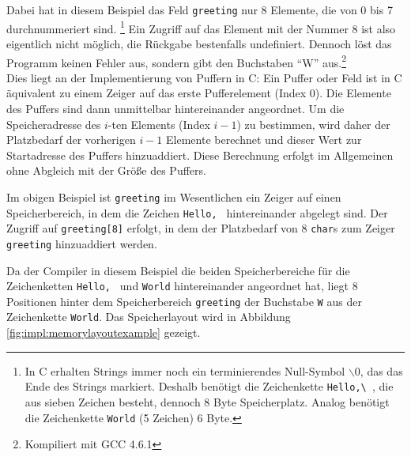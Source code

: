 Dabei hat in diesem Beispiel das Feld \lstinline+greeting+ nur 8 Elemente, die von 0 bis 7 durchnummeriert sind.%
\footnote{In C erhalten Strings immer noch ein terminierendes
  Null-Symbol $\backslash$0, das das Ende des Strings markiert. Deshalb
  benötigt die Zeichenkette \lstinline[showspaces=true]+Hello,\ +, die
  aus sieben Zeichen besteht, dennoch 8 Byte Speicherplatz. Analog
  benötigt die Zeichenkette \lstinline+World+ (5 Zeichen) 6 Byte.}  
Ein Zugriff auf das Element mit der Nummer 8 ist also eigentlich nicht möglich, die Rückgabe bestenfalls undefiniert.
Dennoch löst das Programm keinen Fehler aus, sondern gibt den Buchstaben "`W"' aus.\footnote{Kompiliert mit GCC 4.6.1}\\

Dies liegt an der Implementierung von Puffern in C:
Ein Puffer oder Feld ist in C äquivalent zu einem Zeiger auf das erste Pufferelement (Index 0).
Die Elemente des Puffers sind dann unmittelbar hintereinander angeordnet.
Um die Speicheradresse des $i$-ten Elements (Index $i - 1$) zu bestimmen, wird daher der Platzbedarf der vorherigen $i-1$ Elemente berechnet und dieser Wert zur Startadresse des Puffers hinzuaddiert.
Diese Berechnung erfolgt im Allgemeinen ohne Abgleich mit der Größe des Puffers.

Im obigen Beispiel ist \lstinline+greeting+ im Wesentlichen ein Zeiger auf einen Speicherbereich, in dem die Zeichen \lstinline+Hello, + hintereinander abgelegt sind.
Der Zugriff auf \lstinline+greeting[8]+ erfolgt, in dem der Platzbedarf von 8 \lstinline+char+s zum Zeiger \lstinline+greeting+ hinzuaddiert werden.

Da der Compiler in diesem Beispiel die beiden Speicherbereiche für die Zeichenketten \lstinline+Hello, + und \lstinline+World+ hintereinander angeordnet hat,
liegt 8 Positionen hinter dem Speicherbereich \lstinline+greeting+ der Buchstabe \lstinline+W+ aus der Zeichenkette \lstinline+World+.
Das Speicherlayout wird in Abbildung \ref{fig:impl:memorylayoutexample} gezeigt.

